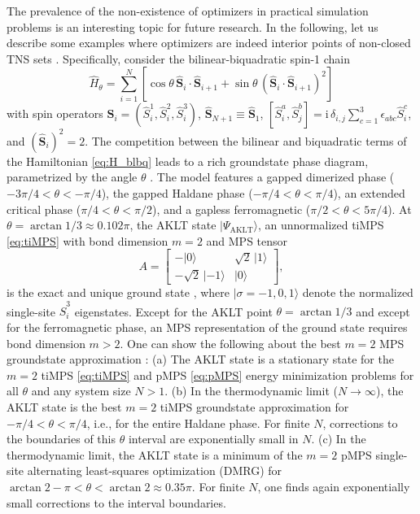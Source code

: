 \documentclass[english,11pt,aps,pra,onecolumn,tightenlines,groupedaddress,superscriptaddress,notitlepage,floatfix,fleqn]{revtex4-1}
\newcommand{\ket}{\rangle}
\renewcommand{\vec}[1]{{\boldsymbol{#1}}}
\newcommand{\hH}{\hat{H}}
\newcommand{\hS}{\hat{S}}
\newcommand{\hvS}{\hat{\vec{S}}}
\newcommand{\AKLT}{\text{AKLT}}
\renewcommand{\Bmatrix}[1]{\begin{bmatrix}#1\end{bmatrix}}
\begin{document}
The prevalence of the non-existence of optimizers in practical simulation problems is an interesting topic for future research. In the following, let us describe some examples where optimizers are indeed interior points of non-closed TNS sets \cite{Note3}. Specifically, consider the bilinear-biquadratic spin-1 chain
\begin{equation} \label{eq:H_blbq} \textstyle
	\hH_\theta = \sum_{i=1}^N\left[\cos\theta\,\hat{\vec{S}}_i \cdot \hat{\vec{S}}_{i+1} + \sin\theta\, (\hat{\vec{S}}_i \cdot \hat{\vec{S}}_{i+1})^2\right]
\end{equation}
with spin operators $\hat{\vec{S}}_i=(\hS^1_i,\hS^2_i,\hS^3_i)$, $\hat{\vec{S}}_{N+1}\equiv\hat{\vec{S}}_{1}$, $[\hS^a_i,\hS^b_j]=\mathrm{i}\,\delta_{i,j}\sum_{c=1}^3\epsilon_{abc}\hS^c_i$, and $(\hvS_i)^2=2$. 
The competition between the bilinear and biquadratic terms of the Hamiltonian \eqref{eq:H_blbq} leads to a rich groundstate phase diagram, parametrized by the angle $\theta$ \cite{Mikeska2004,Laeuchli2006-74,Binder2020-102}. The model features a gapped dimerized phase ($-3\pi/4 < \theta < -\pi/4$), the gapped Haldane phase ($-\pi/4 < \theta <\pi/4$), an extended critical phase ($\pi/4 < \theta < \pi/2$), and a gapless ferromagnetic ($\pi/2 < \theta < 5\pi/4$). At $\theta=\arctan 1/3\approx 0.102\pi$, the AKLT state $|\Psi_\AKLT\ket$, an unnormalized tiMPS \eqref{eq:tiMPS} with bond dimension $m=2$ and MPS tensor
\begin{equation}\label{eq:AKLT}
	A=\Bmatrix{-|0\ket&\sqrt{2}\,|1\ket\\ -\sqrt{2}\,|{-1}\ket&|0\ket},
\end{equation}
is the exact and unique ground state \cite{Affleck1987-59,Affleck1988-115}, where $|{\sigma=-1,0,1}\ket$ denote the normalized single-site $\hS^3_i$ eigenstates. Except for the AKLT point $\theta=\arctan 1/3$ and except for the ferromagnetic phase, an MPS representation of the ground state requires bond dimension $m>2$. One can show the following about the best $m=2$ MPS groundstate approximation \cite{Note3}:
(a) The AKLT state is a stationary state for the $m=2$ tiMPS \eqref{eq:tiMPS} and pMPS \eqref{eq:pMPS} energy minimization problems for all $\theta$ and any system size $N>1$.
(b) In the thermodynamic limit ($N\to\infty$), the AKLT state is the best $m=2$ tiMPS groundstate approximation for $-\pi/4 <\theta<\pi/4$, i.e., for the entire Haldane phase. For finite $N$, corrections to the boundaries of this $\theta$ interval are exponentially small in $N$.
(c) In the thermodynamic limit, the AKLT state is a minimum of the $m=2$ pMPS single-site alternating least-squares optimization (DMRG) for $\arctan 2-\pi <\theta<\arctan 2\approx 0.35\pi$. For finite $N$, one finds again exponentially small corrections to the interval boundaries.
\end{document}
